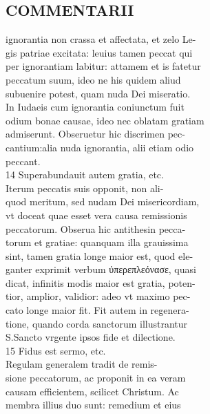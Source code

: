 \documentclass{article}
\begin{document}
\begin{pages}
\section*{COMMENTARII \\
                }ignorantia non crassa et affectata, et zelo Le- \\
                gis patriae excitata: leuius tamen peccat qui \\
                per ignorantiam labitur: attamem et is fatetur \\
                peccatum suum, ideo ne his quidem aliud \\
                subuenire potest, quam nuda Dei miseratio. \\
                In Iudaeis cum ignorantia coniunctum fuit \\
                odium bonae causae, ideo nec oblatam gratiam \\
                admiserunt. Obseruetur hic discrimen pec- \\
                cantium:alia nuda ignorantia, alii etiam odio \\
                peccant. \\
                14 Superabundauit autem gratia, etc. \\
                Iterum peccatis suis opponit, non ali- \\
                quod meritum, sed nudam Dei misericordiam, \\
                vt doceat quae esset vera causa remissionis \\
                peccatorum. Obserua hic antithesin pecca- \\
                torum et gratiae: quanquam illa grauissima \\
                sint, tamen gratia longe maior est, quod ele- \\
                ganter exprimit verbum ὐπερεπλεόνασε, quasi \\
                dicat, infinitis modis maior est gratia, poten- \\
                tior, amplior, validior: adeo vt maximo pec- \\
                cato longe maior fit. Fit autem in regenera- \\
                tione, quando corda sanctorum illustrantur \\
                S.Sancto vrgente ipsos fide et dilectione. \\
                15 Fidus est sermo, etc. \\
                Regulam generalem tradit de remis- \\
                sione peccatorum, ac proponit in ea veram \\
                causam efficientem, scilicet Christum. Ac \\
                membra illius duo sunt: remedium et eius \\
                

\end{pages}
\end{document}
